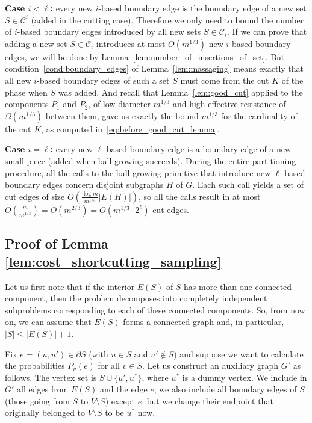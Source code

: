 \documentclass[11pt, letterpaper]{article}
\newcommand{\cC}{\mathcal{C}}
\newcommand{\tO}{\widetilde{O}}
\newcommand{\cut}{{K}}
\begin{document}
\textbf{Case $i < \ell$:} every new $i$-based boundary edge is the boundary edge of a new set $S \in \cC^i$ (added in the cutting case). Therefore we only need to bound the number of $i$-based boundary edges introduced by all new sets $S \in \cC_i$. If we can prove that adding a new set $S \in \cC_i$ introduces at most $O(m^{1/3})$ new $i$-based boundary edges, we will be done by Lemma~\ref{lem:number_of_insertions_of_set}. But condition~\eqref{cond:boundary_edges} of Lemma~\ref{lem:massaging} means exactly that all new $i$-based boundary edges of such a set $S$ must come from the cut $\cut$ of the phase when $S$ was added. And recall that Lemma~\ref{lem:good_cut} applied to the components $P_1$ and $P_2$, of low diameter $m^{1/3}$ and high effective resistance of $\Omega(m^{1/3})$ between them, gave us exactly the bound $m^{1/3}$ for the cardinality of the cut $\cut$, as computed in~\eqref{eq:before_good_cut_lemma}.

\textbf{Case $i = \ell$:} every new $\ell$-based boundary edge is a boundary edge of a new small piece (added when ball-growing succeeds). During the entire partitioning procedure, all the calls to the ball-growing primitive that introduce new $\ell$-based boundary edges concern disjoint subgraphs $H$ of $G$. Each such call yields a set of cut edges of size $O \left( \frac{\log m}{m^{1/3}}|E(H)| \right)$, so all the calls result in at most $\tO \left( \frac{m}{m^{1/3}} \right) = \tO(m^{2/3}) = \tO(m^{1/3} \cdot 2^\ell)$ cut edges.


\subsection{Proof of Lemma \ref{lem:cost_shortcutting_sampling}}\label{app:cost_shortcutting_sampling}

Let us first note that if the interior $E(S)$ of $S$ has more than one connected component, then the problem decomposes into completely independent subproblems corresponding to each of these connected components. So, from now on, we can assume that $E(S)$ forms a connected graph and, in particular, $|S|\leq |E(S)|+1$. 

Fix $e=(u,u')\in \partial S$ (with $u\in S$ and $u'\notin S$) and suppose we want to calculate the probabilities $P_v(e)$ for all $v\in S$. Let us construct an auxiliary graph $G'$ as follows. The vertex set is $S\cup\{u',u^*\}$, where $u^*$ is a dummy vertex. We include in $G'$ all edges from $E(S)$ and the edge $e$; we also include all boundary edges of $S$ (those going from $S$ to $V \setminus S$) except $e$, but we change their endpoint that originally belonged to $V \setminus S$  to be $u^*$ now.
\end{document}
